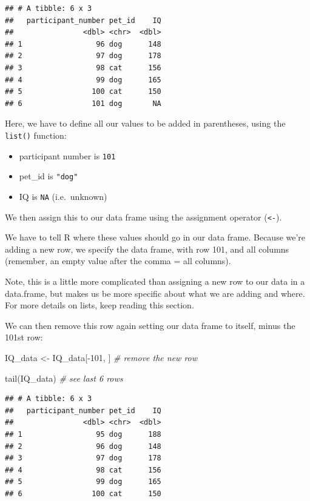 \documentclass[
]{book}
\newenvironment{Shaded}{\begin{snugshade}}{\end{snugshade}}
\newcommand{\CommentTok}[1]{\textcolor[rgb]{0.56,0.35,0.01}{\textit{#1}}}
\newcommand{\DecValTok}[1]{\textcolor[rgb]{0.00,0.00,0.81}{#1}}
\newcommand{\FunctionTok}[1]{\textcolor[rgb]{0.00,0.00,0.00}{#1}}
\newcommand{\NormalTok}[1]{#1}
\newcommand{\OtherTok}[1]{\textcolor[rgb]{0.56,0.35,0.01}{#1}}
\newcommand{\SpecialCharTok}[1]{\textcolor[rgb]{0.00,0.00,0.00}{#1}}
\providecommand{\tightlist}{%
  \setlength{\itemsep}{0pt}\setlength{\parskip}{0pt}}
\begin{document}
\begin{verbatim}
## # A tibble: 6 x 3
##   participant_number pet_id    IQ
##                <dbl> <chr>  <dbl>
## 1                 96 dog      148
## 2                 97 dog      178
## 3                 98 cat      156
## 4                 99 dog      165
## 5                100 cat      150
## 6                101 dog       NA
\end{verbatim}

Here, we have to define all our values to be added in parentheses, using the \texttt{list()} function:

\begin{itemize}
\tightlist
\item
  participant number is \texttt{101}
\item
  pet\_id is \texttt{"dog"}
\item
  IQ is \texttt{NA} (i.e.~unknown)
\end{itemize}

We then assign this to our data frame using the assignment operator (\texttt{\textless{}-}).

We have to tell R where these values should go in our data frame. Because we're adding a new row, we specify the data frame, with row 101, and all columns (remember, an empty value after the comma = all columns).

Note, this is a little more complicated than assigning a new row to our data in a data.frame, but makes us be more specific about what we are adding and where. For more details on lists, keep reading this section.

We can then remove this row again setting our data frame to itself, minus the 101st row:

\begin{Shaded}
\begin{Highlighting}[]
\NormalTok{IQ\_data }\OtherTok{\textless{}{-}}\NormalTok{ IQ\_data[}\SpecialCharTok{{-}}\DecValTok{101}\NormalTok{, ] }\CommentTok{\# remove the new row}

\FunctionTok{tail}\NormalTok{(IQ\_data) }\CommentTok{\# see last 6 rows}
\end{Highlighting}
\end{Shaded}

\begin{verbatim}
## # A tibble: 6 x 3
##   participant_number pet_id    IQ
##                <dbl> <chr>  <dbl>
## 1                 95 dog      188
## 2                 96 dog      148
## 3                 97 dog      178
## 4                 98 cat      156
## 5                 99 dog      165
## 6                100 cat      150
\end{verbatim}
\end{document}

